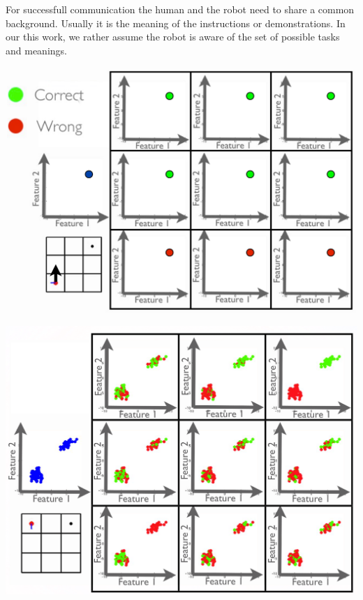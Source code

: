 \documentclass[a0,final, portrait]{inriaposter}
\begin{document}
\begin{multicols}{2}
{For successfull communication the human and the robot need to share a common background. Usually it is the meaning of the instructions or demonstrations. In our this work, we rather assume the robot is aware of the set of possible tasks and meanings.
}

{\begin{center}
\begin{minipage}{.46\columnwidth}
	\begin{center}
		\includegraphics[width=\columnwidth]{images/toy_solution.png}
	\end{center}
\end{minipage}
\begin{minipage}{.02\columnwidth}
	\begin{center}

	\end{center}
\end{minipage}
\begin{minipage}{.442\columnwidth}
	\begin{center}
		\includegraphics[width=\columnwidth]{images/toy_sol.png}
	\end{center}
\end{minipage}
\end{center}
\vspace{1cm}

}
\end{multicols}
\end{document}
